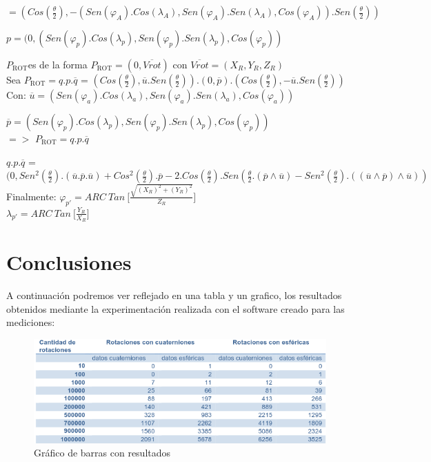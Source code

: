 \documentclass[spanish]{article}
\begin{document}
\(= (Cos(\frac{\theta}{2}), - (Sen(\varphi_{A}).Cos(\lambda_{A}),Sen(\varphi_{A}).Sen(\lambda_{A}),Cos(\varphi_{A})).Sen(\frac{\theta}{2}))\)

\(p = (0,(Sen(\varphi_{p}).Cos(\lambda_{p}),Sen(\varphi_{p}).Sen(\lambda_{p}),Cos(\varphi_{p}))\)

\(P_{\text{ROT}}\)es de la forma \(P_{\text{ROT}} = (0,\overline{Vrot})\) con
\(\overline{Vrot}= (X_{R},Y_{R},Z_{R})\)\\


Sea \(P_{\text{ROT}} = q.p.\overline{q}\) = \((Cos(\frac{\theta}{2}), \overline{u}.Sen(\frac{\theta}{2}))\).\((0,\overline{p}) \).\( (Cos(\frac{\theta}{2}), -\overline{u}.Sen(\frac{\theta}{2}))\)\\

Con: 
\(\overline{u} = (Sen(\varphi_{a}).Cos(\lambda_{a}), Sen(\varphi_{a}).Sen(\lambda_{a}),Cos(\varphi_{a}))\)

\(\overline{p} = (Sen(\varphi_{p}).Cos(\lambda_{p}),Sen(\varphi_{p}).Sen(\lambda_{p}),Cos(\varphi_{p}))\)\\


\(=>\) \(P_{\text{ROT}} = q.p.\overline{q} \)

\(q.p.\overline{q}\) = \((0, Sen^2(\frac{\theta}{2}).(\overline{u}.\overline{p}.\overline{u}) + Cos^2(\frac{\theta}{2}).\overline{p} - 2.Cos(\frac{\theta}{2}).Sen(\frac{\theta}{2}.(\overline{p} \wedge \overline{u}) - Sen^2(\frac{\theta}{2}).((\overline{u}\wedge\overline{p})\wedge\overline{u})) \)\\


Finalmente: \(\varphi_{p'} = ARC\ Tan\ \lbrack\frac{\sqrt{(X_{R})^2+(Y_{R})^2}}{Z_{R}}\rbrack\)\\

\(\lambda_{p'} = ARC\ Tan\ \lbrack\frac{Y_{R}}{X_{R}}\rbrack\)
  
\clearpage  
\section{Conclusiones}

A continuación podremos ver reflejado en una tabla y un grafico, los resultados obtenidos mediante la experimentación realizada con el software creado para las mediciones:

\begin{figure}[H]
  \centering
    \includegraphics{result.png}
  \caption{Gráfico de barras con resultados}
  \label{fig:ejemplo}
\end{figure}\\
\end{document}
